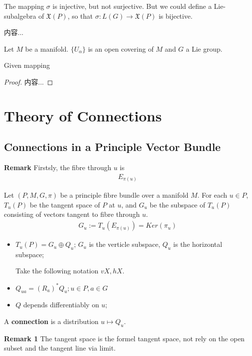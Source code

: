 \documentclass[Total.tex]{subfiles}
\begin{document}
				The mapping $\sigma$ is injective, but not surjective. But we could define a Lie-subalgebra of $\mathfrak{X}(P)$, so that $\sigma:L(G)\rightarrow \mathfrak{X}(P)$ is bijective.
				
				\begin{Def}
					内容...
				\end{Def}
				
				\begin{proposition}
					Let $M$ be a manifold. $\{U_\alpha\}$ is an open covering of $M$ and $G$ a Lie group. 
					
					Given mapping 
				\end{proposition}
				\begin{proof}
					内容...
				\end{proof}
	
	\chapter{Theory of Connections}
		\section{Connections in a Principle Vector Bundle}
			\textbf{Remark} Firstsly, the fibre through $u$ is 
			\begin{gather*}
				E_{\pi(u)}
			\end{gather*}
			
			\begin{Def}
				Let $(P,M,G,\pi)$ be a principle fibre bundle over a manifold $M$. For each $u\in P$, $T_u(P)$ be the tangent space of $P$ at $u$, and $G_u$ be the subspace of $T_u(P)$ consisting of vectors tangent to fibre through $u$. 
				\begin{gather*}
					G_u:=T_u(E_{\pi(u)})=Ker(\pi_u)
				\end{gather*}
				\begin{itemize}
					\item $T_u(P)=G_u\oplus Q_u$; $G_u$ is the verticle subspace, $Q_u$ is the horizontal subspace;
					
					Take the following notation $vX,hX$. 
					\item $Q_{ua}=(R_a)^*Q_u;u\in P,a\in G$
					\item $Q$ depends differentiably on $u$;
				\end{itemize}
				A \textbf{connection} is a distribution $u\mapsto Q_u$. 
			\end{Def}
			
			\textbf{Remark 1} The tangent space is the formel tangent space, not rely on the open subset and the tangent line via limit. 
			
\end{document}
